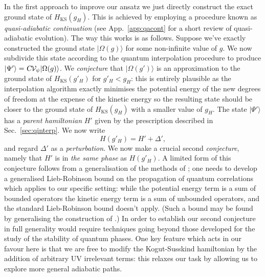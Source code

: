 \documentclass[twocolumn,lengthcheck,superscriptaddress]{revtex4-1}
\theoremstyle{definition}
\theoremstyle{remark}
\begin{document}

In the first approach to improve our ansatz we just directly construct the exact ground state of $H_{\text{KS}}(g_H)$. This is achieved by employing a procedure known as \emph{quasi-adiabatic continuation} \cite{hastings:2005a, osborne:2006a} (see App.~\ref{app:qacont} for a short review of quasi-adiabatic evolution). The way this works is as follows. Suppose we've exactly constructed the ground state $|\Omega(g)\rangle$ for some non-infinite value of $g$. We now subdivide this state according to the quantum interpolation procedure to produce $|\Psi'\rangle = \textsl{C}\mathcal{V}_{\psi}|\Omega(g)\rangle$. We \emph{conjecture} that $|\Omega(g')\rangle$ is an approximation to the ground state of $H_{\text{KS}}(g'_H)$ for $g'_H < g_H$: this is entirely plausible as the interpolation algorithm exactly minimises the potential energy of the new degrees of freedom at the expense of the kinetic energy so the resulting state should be closer to the ground state of $H_{\text{KS}}(g_H)$ with a smaller value of $g_H$. The state $|\Psi'\rangle$ has a \emph{parent hamiltonian} $H'$ given by the prescription described in Sec.~\ref{sec:qinterp}. We now write 
\begin{equation}
	H(g'_H) = H' + \Delta',
\end{equation}
and regard $\Delta'$ as a \emph{perturbation}. We now make a crucial second \emph{conjecture}, namely that $H'$ is in \emph{the same phase} as $H(g'_H)$. A limited form of this conjecture follows from a generalisation of the methods of \cite{bravyi:2010b, bravyi:2010c, michalakis:2013a}; one needs to develop a generalised Lieb-Robinson bound \cite{lieb:1972a, hastings:2005b, nachtergaele:2010b} on the propagation of quantum correlations which applies to our specific setting: while the potential energy term is a sum of bounded operators the kinetic energy term is a sum of unbounded operators, and the standard Lieb-Robinson bound doesn't apply. (Such a bound may be found by generalising the construction of \cite{premont-schwarz:2010a}.) In order to establish our second conjecture in full generality would require techniques going beyond those developed for the study of the stability of quantum phases. One key feature which acts in our favour here is that we are free to modify the Kogut-Susskind hamiltonian by the addition of arbitrary UV irrelevant terms: this relaxes our task by allowing us to explore more general adiabatic paths.
\end{document}
